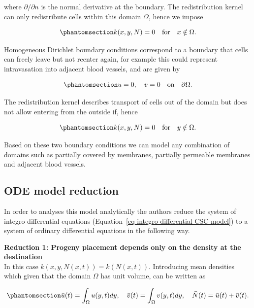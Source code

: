 \documentclass[
  letterpaper,
]{scrreprt}
\theoremstyle{definition}
\theoremstyle{remark}
\begin{document}
where \(\partial / \partial n\) is the normal derivative at the
boundary. The redistribution kernel can only redistribute cells within
this domain \(\Omega\), hence we impose

\begin{equation}\phantomsection\label{eq-redistribution-kernel-neumann-BC}{
k(x,y,N) = 0 \quad \text{for} \quad x \notin \Omega. 
}\end{equation}

Homogeneous Dirichlet boundary conditions correspond to a boundary that
cells can freely leave but not reenter again, for example this could
represent intravasation into adjacent blood vessels, and are given by

\begin{equation}\phantomsection\label{eq-homogeneous-dirichlet-boundary-conditions}{
u = 0, \quad v = 0 \quad \text{on} \quad \partial \Omega.
}\end{equation}

The redistribution kernel describes transport of cells out of the domain
but does not allow entering from the outside if, hence

\begin{equation}\phantomsection\label{eq-redistribution-kernel-dirichlet-BC}{
k(x,y,N) = 0 \quad \text{for} \quad y \notin \Omega.
}\end{equation}

Based on these two boundary conditions we can model any combination of
domains such as partially covered by membranes, partially permeable
membranes and adjacent blood vessels.

\subsection{ODE model reduction}\label{sec-ode-model-reduction}

In order to analyses this model analytically the authors reduce the
system of integro-differential equations
(Equation~\ref{eq-integro-differential-CSC-model}) to a system of
ordinary differential equations in the following way.

\textbf{Reduction 1: Progeny placement depends only on the density at
the destination}\\
In this case \(k(x,y,N(x,t)) = k(N(x,t))\). Introducing mean densities
which given that the domain \(\Omega\) has unit volume, can be written
as

\begin{equation}\phantomsection\label{eq-density-mean}{
\bar{u}(t) = \int_{\Omega} u(y,t) dy, \quad \bar{v}(t) = \int_{\Omega} v(y,t) dy, \quad \bar{N}(t) = \bar{u}(t) + \bar{v}(t).
}\end{equation}
\end{document}
